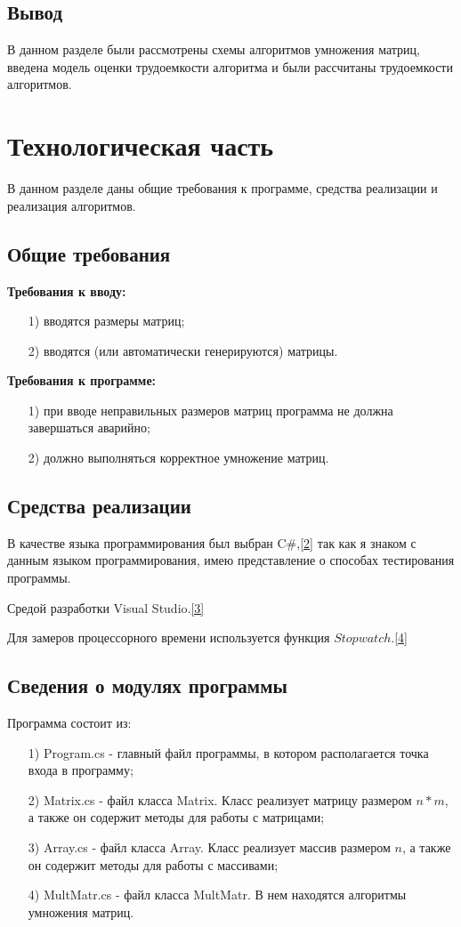 \documentclass[12pt]{report}
\begin{document}
	\section{Вывод}
	В данном разделе были рассмотрены схемы алгоритмов умножения матриц, введена модель оценки трудоемкости алгоритма и были рассчитаны трудоемкости алгоритмов.
	
	\chapter{Технологическая часть}
	В данном разделе даны общие требования к программе, средства реализации и реализация алгоритмов.
	\section{Общие требования}
	\textbf{Требования к вводу:}
	\begin{enumerate}
		\item[1)] вводятся размеры матриц;
		\item[2)] вводятся (или автоматически генерируются) матрицы.
	\end{enumerate}
	\noindent\textbf{Требования к программе:}
	\begin{enumerate}
		\item[1)] при вводе неправильных размеров матриц программа не должна завершаться аварийно;
		\item[2)] должно выполняться корректное умножение матриц.
	\end{enumerate}
	
	\section{Средства реализации}
	В качестве языка программирования был выбран C\#,\hyperref[literature]{[2]} так как я знаком с данным языком программирования, имею представление о способах тестирования программы.\par
	Средой разработки Visual Studio.\hyperref[literature]{[3]}\par 
	Для замеров процессорного времени используется функция $Stopwatch$.\hyperref[literature]{[4]}
	
	\section{Сведения о модулях программы}
	Программа состоит из:
	\begin{enumerate}
		\item[1)] Program.cs - главный файл программы, в котором располагается точка входа в программу;
		\item[2)] Matrix.cs - файл класса Matrix. Класс реализует матрицу размером $n*m$, а также он содержит методы для работы с матрицами;
		\item[3)] Array.cs - файл класса Array. Класс реализует массив размером $n$, а также он содержит методы для работы с массивами;
		\item[4)] MultMatr.cs - файл класса MultMatr. В нем находятся алгоритмы умножения матриц.
	\end{enumerate}
	
\end{document}
